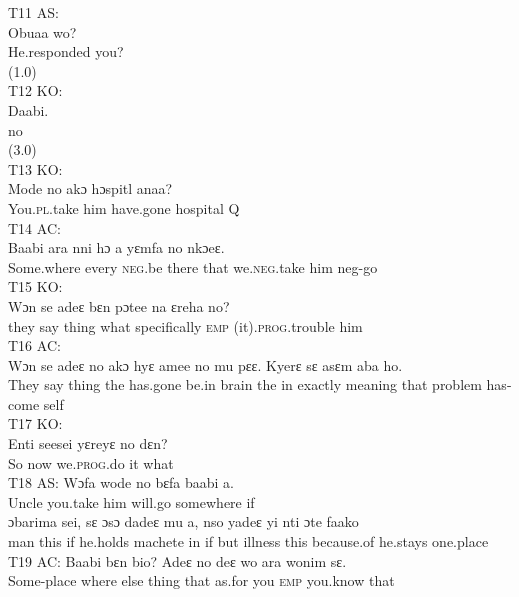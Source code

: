 \documentclass[output=paper,colorlinks,citecolor=brown]{langscibook}
\begin{document}
\ex T11 AS:\\\label{ex:obeng:40}
    \gll    Obuaa wo?\\
            He.responded you?\\
            (1.0)\\
\ex T12 KO:\\\label{ex:obeng:41}
    \gll    Daabi. \\
            no \\
            (3.0)\\
\ex
    T13 KO:\\\label{ex:obeng:42}
    \gll    Mode no akɔ hɔspitl anaa? \\
            You.\textsc{pl}.take him have.gone hospital Q \\
\ex
    T14 AC:\\\label{ex:obeng:43}
    \gll    Baabi ara nni hɔ a yɛmfa no nkɔeɛ. \\
            Some.where every \textsc{neg}.be there that we.\textsc{neg}.take him neg-go \\
\ex
    T15 KO:\\\label{ex:obeng:44}
    \gll    Wɔn se adeɛ bɛn pɔtee na ɛreha no? \\
            they say thing what specifically \textsc{emp} (it).\textsc{prog}.trouble him \\
\ex
    T16 AC:\\\label{ex:obeng:45}
    \gll    Wɔn se adeɛ no akɔ hyɛ amee no mu pɛɛ. Kyerɛ sɛ asɛm aba ho. \\
            They say thing the has.gone be.in brain the in exactly meaning that problem has-come self \\
\ex
    T17 KO:\\\label{ex:obeng:46}
    \gll    Enti seesei yɛreyɛ no dɛn? \\
            So now we.\textsc{prog}.do it what \\
\ex T18 AS:\label{ex:obeng:47}
    \ea 
    \gll    Wɔfa wode no bɛfa baabi a. \\
            Uncle you.take him will.go somewhere if \\
    \ex
    \gll    ɔbarima sei, sɛ ɔsɔ dadeɛ mu  a, nso yadeɛ yi nti ɔte faako\\
            man this if he.holds machete in if but illness this because.of he.stays one.place \\
    \z
\ex T19 AC:\label{ex:obeng:48}
    \ea
    \gll    Baabi bɛn bio? Adeɛ no deɛ wo ara wonim sɛ. \\
            Some-place where else thing that as.for you \textsc{emp} you.know that \\
\end{document}
